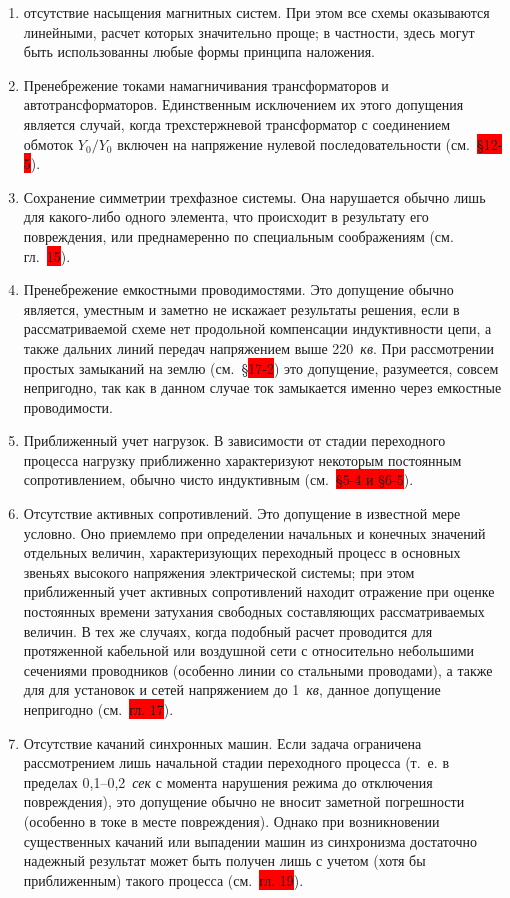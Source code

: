 \begin{enumerate} 
	\item
	отсутствие насыщения магнитных систем. При этом все схемы оказываются линейными, расчет которых значительно проще; в частности, здесь могут быть использованны любые формы принципа наложения.
	\item
	Пренебрежение токами намагничивания трансформаторов и автотрансформаторов. Единственным исключением их этого допущения является случай, когда трехстержневой трансформатор с соединением обмоток $ Y_{0}/Y_{0} $ включен на напряжение нулевой последовательности (см.~\colorbox{red}{§12-5}).
	\item
	Сохранение симметрии трехфазное системы. Она нарушается обычно лишь для какого-либо одного элемента, что происходит в результату его повреждения, или преднамеренно по специальным соображениям (см. гл.~\colorbox{red}{15}).
	\item
	Пренебрежение емкостными проводимостями. Это допущение обычно является, уместным и заметно не искажает результаты решения, если в рассматриваемой схеме нет продольной компенсации индуктивности цепи, а также дальних линий передач напряжением выше 220~\textit{кв}. При рассмотрении простых замыканий на землю (см.~§\colorbox{red}{17-2}) это допущение, разумеется, совсем непригодно, так как в данном случае ток замыкается именно через емкостные проводимости.
	\item
	Приближенный учет нагрузок. В зависимости от стадии переходного процесса нагрузку приближенно характеризуют некоторым постоянным сопротивлением, обычно чисто индуктивным (см.~\colorbox{red}{§5-4 и §6-5}).
	\item
	Отсутствие активных сопротивлений. Это допущение в известной мере условно. Оно приемлемо при определении начальных и конечных значений отдельных величин, характеризующих переходный процесс в основных звеньях высокого напряжения электрической системы; при этом приближенный учет активных сопротивлений находит отражение при оценке постоянных времени затухания свободных составляющих рассматриваемых величин. В тех же случаях, когда подобный расчет проводится для протяженной кабельной или воздушной сети с относительно небольшими сечениями проводников (особенно линии со стальными проводами), а также для для установок и сетей напряжением до 1~\textit{кв}, данное допущение непригодно (см.~\colorbox{red}{гл. 17}).
	\item
	Отсутствие качаний синхронных машин. Если задача ограничена рассмотрением лишь начальной стадии переходного процесса (т.~е. в пределах 0,1--0,2~\textit{сек} с момента нарушения режима до отключения повреждения), это допущение обычно не вносит заметной погрешности (особенно в токе в месте повреждения). Однако при возникновении существенных качаний или выпадении машин из синхронизма достаточно надежный результат может быть получен лишь с учетом (хотя бы приближенным) такого процесса (см.~\colorbox{red}{гл. 19}).
\end{enumerate}

